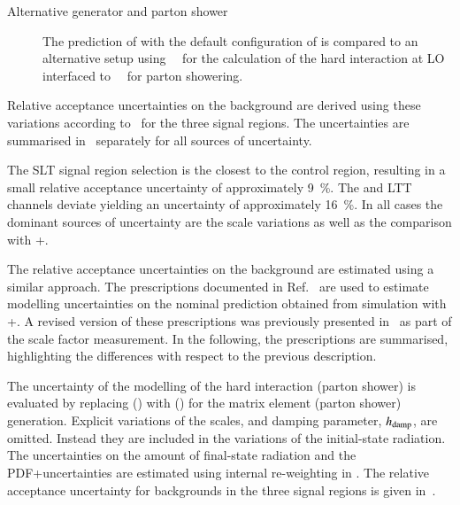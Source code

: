\begin{description}
\item[Alternative generator and parton shower] The prediction of
  \Zjets with the default configuration of \SHERPA[2.2.1] is compared
  to an alternative setup using~\MGNLO[2.2.2]~\cite{Alwall:2014hca}
  for the calculation of the hard interaction at LO interfaced
  to~\PYTHIA[8.186]~\cite{Sjostrand:2007gs} for parton showering.

\end{description}
Relative acceptance uncertainties on the \ZHF background are derived
using these variations according
to~ for the three signal
regions. The uncertainties are summarised
in~ separately for all sources of
uncertainty.

The \lephad SLT signal region selection is the closest to the \ZHF
control region, resulting in a small relative acceptance uncertainty
of approximately \SI{9}{\percent}. The \hadhad and \lephad LTT
channels deviate yielding an uncertainty of approximately
\SI{16}{\percent}. In all cases the dominant sources of uncertainty
are the scale variations as well as the comparison with
\MGNLO+\PYTHIA[8].

The relative acceptance uncertainties on the \ttbar background are
estimated using a similar approach. The prescriptions documented in
Ref.~\cite{ATL-PHYS-PUB-2020-023} are used to estimate modelling
uncertainties on the nominal prediction obtained from simulation with
\POWHEGBOX[v2]+\PYTHIA[8]. A revised version of these prescriptions
was previously presented in~ as part
of the \ttbarFakes scale factor measurement. In the following, the
prescriptions are summarised, highlighting the differences with
respect to the previous description.

The uncertainty of the modelling of the hard interaction (parton
shower) is evaluated by replacing \POWHEGBOX[v2] (\PYTHIA[8]) with
\MGNLO (\HERWIG[7]) for the matrix element (parton shower)
generation. Explicit variations of the scales, and \PYTHIA[8] damping
parameter, $h_\mathrm{damp}$, are omitted. Instead they are included in the
variations of the initial-state radiation. The uncertainties on the
amount of final-state radiation and the PDF+\alphas uncertainties are
estimated using internal re-weighting in \PYTHIA[8]. The relative
acceptance uncertainty for \ttbar backgrounds in the three signal
regions is given in~.

